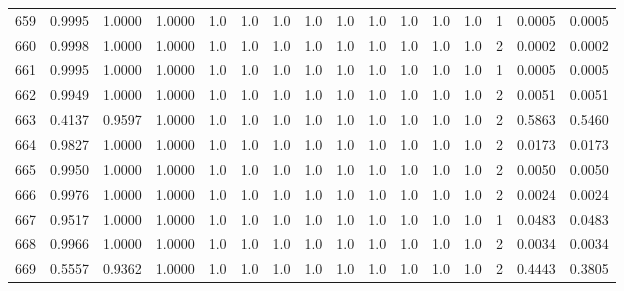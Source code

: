 \begin{tabular}{lrrrrrrrrrrrrrrr}
659 &      0.9995 &  1.0000 &  1.0000 &     1.0 &     1.0 &     1.0 &     1.0 &     1.0 &     1.0 &     1.0 &      1.0 &        1.0 &      1 &                    0.0005 &                     0.0005 \\
660 &      0.9998 &  1.0000 &  1.0000 &     1.0 &     1.0 &     1.0 &     1.0 &     1.0 &     1.0 &     1.0 &      1.0 &        1.0 &      2 &                    0.0002 &                     0.0002 \\
661 &      0.9995 &  1.0000 &  1.0000 &     1.0 &     1.0 &     1.0 &     1.0 &     1.0 &     1.0 &     1.0 &      1.0 &        1.0 &      1 &                    0.0005 &                     0.0005 \\
662 &      0.9949 &  1.0000 &  1.0000 &     1.0 &     1.0 &     1.0 &     1.0 &     1.0 &     1.0 &     1.0 &      1.0 &        1.0 &      2 &                    0.0051 &                     0.0051 \\
663 &      0.4137 &  0.9597 &  1.0000 &     1.0 &     1.0 &     1.0 &     1.0 &     1.0 &     1.0 &     1.0 &      1.0 &        1.0 &      2 &                    0.5863 &                     0.5460 \\
664 &      0.9827 &  1.0000 &  1.0000 &     1.0 &     1.0 &     1.0 &     1.0 &     1.0 &     1.0 &     1.0 &      1.0 &        1.0 &      2 &                    0.0173 &                     0.0173 \\
665 &      0.9950 &  1.0000 &  1.0000 &     1.0 &     1.0 &     1.0 &     1.0 &     1.0 &     1.0 &     1.0 &      1.0 &        1.0 &      2 &                    0.0050 &                     0.0050 \\
666 &      0.9976 &  1.0000 &  1.0000 &     1.0 &     1.0 &     1.0 &     1.0 &     1.0 &     1.0 &     1.0 &      1.0 &        1.0 &      2 &                    0.0024 &                     0.0024 \\
667 &      0.9517 &  1.0000 &  1.0000 &     1.0 &     1.0 &     1.0 &     1.0 &     1.0 &     1.0 &     1.0 &      1.0 &        1.0 &      1 &                    0.0483 &                     0.0483 \\
668 &      0.9966 &  1.0000 &  1.0000 &     1.0 &     1.0 &     1.0 &     1.0 &     1.0 &     1.0 &     1.0 &      1.0 &        1.0 &      2 &                    0.0034 &                     0.0034 \\
669 &      0.5557 &  0.9362 &  1.0000 &     1.0 &     1.0 &     1.0 &     1.0 &     1.0 &     1.0 &     1.0 &      1.0 &        1.0 &      2 &                    0.4443 &                     0.3805 \\

\end{tabular}
